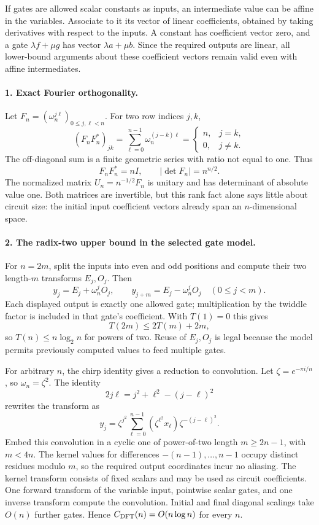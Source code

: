 \documentclass[11pt]{article}
\begin{document}
If gates are allowed scalar constants as inputs, an intermediate value can be affine in the variables. Associate to it its vector of linear coefficients, obtained by taking derivatives with respect to the inputs. A constant has coefficient vector zero, and a gate $\lambda f+\mu g$ has vector $\lambda a+\mu b$. Since the required outputs are linear, all lower-bound arguments about these coefficient vectors remain valid even with affine intermediates.

\paragraph{1. Exact Fourier orthogonality.}
Let $F_n=(\omega_n^{j\ell})_{0\le j,\ell<n}$. For two row indices $j,k$,
\[
 (F_nF_n^*)_{jk}=\sum_{\ell=0}^{n-1}\omega_n^{(j-k)\ell}
 =\begin{cases}n,&j=k,\\0,&j\ne k.\end{cases}
\]
The off-diagonal sum is a finite geometric series with ratio not equal to one. Thus
\[
 F_nF_n^*=nI,\qquad |\det F_n|=n^{n/2}.
\]
The normalized matrix $U_n=n^{-1/2}F_n$ is unitary and has determinant of absolute value one. Both matrices are invertible, but this rank fact alone says little about circuit size: the initial input coefficient vectors already span an $n$-dimensional space.

\paragraph{2. The radix-two upper bound in the selected gate model.}
For $n=2m$, split the inputs into even and odd positions and compute their two length-$m$ transforms $E_j,O_j$. Then
\[
 y_j=E_j+\omega_n^jO_j,\qquad
 y_{j+m}=E_j-\omega_n^jO_j\quad(0\le j<m).
\]
Each displayed output is exactly one allowed gate; multiplication by the twiddle factor is included in that gate's coefficient. With $T(1)=0$ this gives
\[
 T(2m)\le2T(m)+2m,
\]
so $T(n)\le n\log_2n$ for powers of two. Reuse of $E_j,O_j$ is legal because the model permits previously computed values to feed multiple gates.

For arbitrary $n$, the chirp identity gives a reduction to convolution. Let $\zeta=e^{-\pi i/n}$, so $\omega_n=\zeta^2$. The identity
\[
 2j\ell=j^2+\ell^2-(j-\ell)^2
\]
rewrites the transform as
\[
 y_j=\zeta^{j^2}\sum_{\ell=0}^{n-1}
       (\zeta^{\ell^2}x_\ell)\zeta^{-(j-\ell)^2}.
\]
Embed this convolution in a cyclic one of power-of-two length $m\ge2n-1$, with $m<4n$. The kernel values for differences $-(n-1),\ldots,n-1$ occupy distinct residues modulo $m$, so the required output coordinates incur no aliasing. The kernel transform consists of fixed scalars and may be used as circuit coefficients. One forward transform of the variable input, pointwise scalar gates, and one inverse transform compute the convolution. Initial and final diagonal scalings take $O(n)$ further gates. Hence $C_{\rm DFT}(n)=O(n\log n)$ for every $n$.
\end{document}

